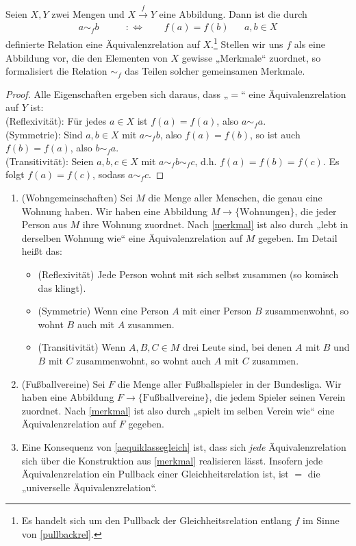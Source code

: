 \begin{bem} \label{merkmal}
    Seien $X,Y$ zwei Mengen und $X\xrightarrow{f} Y$ eine Abbildung. Dann ist die durch
    \begin{align*}
        a \sim_f b \qquad&:\Leftrightarrow\qquad f(a)=f(b) && a,b\in X
    \end{align*}
    definierte Relation eine Äquivalenzrelation auf $X$.\footnote{Es handelt sich um den Pullback der Gleichheitsrelation entlang $f$ im Sinne von \cref{pullbackrel}.} Stellen wir uns $f$ als eine Abbildung vor, die den Elementen von $X$ gewisse „Merkmale“ zuordnet, so formalisiert die Relation $\sim_f$ das Teilen solcher gemeinsamen Merkmale.
\end{bem}
\begin{proof}
    Alle Eigenschaften ergeben sich daraus, dass „$=$“ eine Äquivalenzrelation auf $Y$ ist: \\[0.5em]
    (Reflexivität): Für jedes $a\in X$ ist $f(a)=f(a)$, also $a\sim_f a$. \\[0.5em]
    (Symmetrie): Sind $a,b\in X$ mit $a\sim_f b$, also $f(a)=f(b)$, so ist auch $f(b)=f(a)$, also $b\sim_f a$. \\[0.5em]
    (Transitivität): Seien $a,b,c\in X$ mit $a\sim_f b\sim_f c$, d.h. $f(a)=f(b)=f(c)$. Es folgt  $f(a)=f(c)$, sodass $a\sim_f c$.
\end{proof}


\begin{bsp} \quad
    \begin{enumerate}
        \item(Wohngemeinschaften) Sei $M$ die Menge aller Menschen, die genau eine Wohnung haben. Wir haben eine Abbildung $M\to \{\text{Wohnungen}\}$, die jeder Person aus $M$ ihre Wohnung zuordnet. Nach \cref{merkmal} ist also durch „lebt in derselben Wohnung wie“ eine Äquivalenzrelation auf $M$ gegeben. Im Detail heißt das:
        \begin{itemize}
            \item(Reflexivität) Jede Person wohnt mit sich selbst zusammen (so komisch das klingt).
            \item(Symmetrie) Wenn eine Person $A$ mit einer Person $B$ zusammenwohnt, so wohnt $B$ auch mit $A$ zusammen.
            \item(Transitivität) Wenn $A,B,C\in M$ drei Leute sind, bei denen $A$ mit $B$ und $B$ mit $C$ zusammenwohnt, so wohnt auch $A$ mit $C$ zusammen.
        \end{itemize}
        \item(Fußballvereine) Sei $F$ die Menge aller Fußballspieler in der Bundesliga. Wir haben eine Abbildung $F\to\{\text{Fußballvereine}\}$, die jedem Spieler seinen Verein zuordnet. Nach \cref{merkmal} ist also durch „spielt im selben Verein wie“ eine Äquivalenzrelation auf $F$ gegeben.
        \item Eine Konsequenz von \cref{aequiklassegleich} ist, dass sich \emph{jede} Äquivalenzrelation sich über die Konstruktion aus \cref{merkmal} realisieren lässt. Insofern jede Äquivalenzrelation ein Pullback einer Gleichheitsrelation ist, ist $=$ die „universelle Äquivalenzrelation“.
    \end{enumerate}
\end{bsp}


